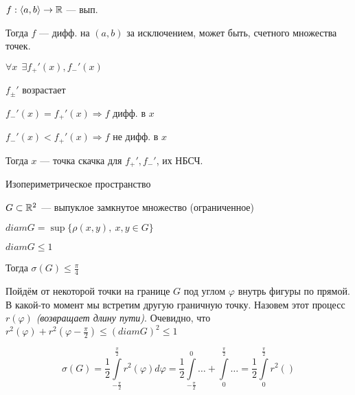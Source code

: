 \begin{remark}
    $f:\langle a,b\rangle\to\mathbb{R}$ --- вып.

    Тогда $f$ --- дифф. на $(a,b)$ за исключением, может быть, счетного множества точек.

    $\forall x \ \ \exists f_+'(x), f_-'(x)$

    $f_\pm'$ возрастает

    $f_-'(x)=f_+'(x)\Rightarrow f$ дифф. в $x$

    $f_-'(x)<f_+'(x)\Rightarrow f$ не дифф. в $x$

    Тогда $x$ --- точка скачка для $f_+', f_-'$, их НБСЧ.
\end{remark}

\begin{example}
    Изопериметрическое пространство

    $G\subset\mathbb{R}^2$ --- выпуклое замкнутое множество (ограниченное)

    $diam G = \sup\{\rho(x,y), \ x,y\in G\}$

    $diam G \leq 1$

    Тогда $\sigma(G)\leq \frac{\pi}{4}$

    Пойдём от некоторой точки на границе $G$ под углом $\varphi$ внутрь фигуры по прямой. В какой-то момент мы встретим другую граничную точку. Назовем этот процесс $r(\varphi)$ \textit{(возвращает длину пути)}. Очевидно, что $r^2(\varphi)+r^2(\varphi-\frac{\pi}{2})\leq (diam G)^2\leq 1$

    $$\sigma(G)=\frac{1}{2}\int\limits_{-\frac{\pi}{2}}^{\frac{\pi}{2}} r^2(\varphi)d\varphi = \frac{1}{2}\int\limits_{-\frac{\pi}{2}}^0\ldots + \int\limits^{\frac{\pi}{2}}_0\ldots = \frac{1}{2}\int\limits_{0}^{\frac{\pi}{2}}r^2()$$
\end{example}

